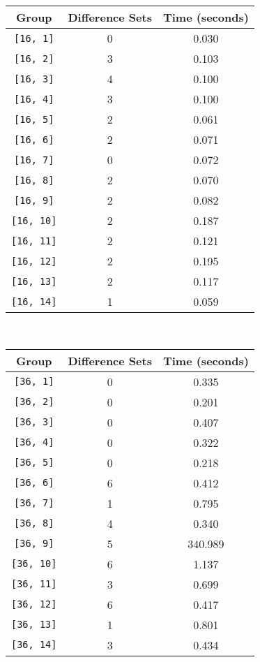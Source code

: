 \documentclass[a4paper,11pt]{report}
\begin{document}
{{ \begin{center}
\begin{tabular}{ccc}Group&
Difference Sets&
Time (seconds)\\
\hline
\texttt{[16, 1]}&
0&
0.030\\
\texttt{[16, 2]}&
3&
0.103\\
\texttt{[16, 3]}&
4&
0.100\\
\texttt{[16, 4]}&
3&
0.100\\
\texttt{[16, 5]}&
2&
0.061\\
\texttt{[16, 6]}&
2&
0.071\\
\texttt{[16, 7]}&
0&
0.072\\
\texttt{[16, 8]}&
2&
0.070\\
\texttt{[16, 9]}&
2&
0.082\\
\texttt{[16, 10]}&
2&
0.187\\
\texttt{[16, 11]}&
2&
0.121\\
\texttt{[16, 12]}&
2&
0.195\\
\texttt{[16, 13]}&
2&
0.117\\
\texttt{[16, 14]}&
1&
0.059\\
\end{tabular}\\[2mm]
\end{center}

 \begin{center}
\begin{tabular}{ccc}Group&
Difference Sets&
Time (seconds)\\
\hline
\texttt{[36, 1]}&
0&
0.335\\
\texttt{[36, 2]}&
0&
0.201\\
\texttt{[36, 3]}&
0&
0.407\\
\texttt{[36, 4]}&
0&
0.322\\
\texttt{[36, 5]}&
0&
0.218\\
\texttt{[36, 6]}&
6&
0.412\\
\texttt{[36, 7]}&
1&
0.795\\
\texttt{[36, 8]}&
4&
0.340\\
\texttt{[36, 9]}&
5&
340.989\\
\texttt{[36, 10]}&
6&
1.137\\
\texttt{[36, 11]}&
3&
0.699\\
\texttt{[36, 12]}&
6&
0.417\\
\texttt{[36, 13]}&
1&
0.801\\
\texttt{[36, 14]}&
3&
0.434\\
\end{tabular}\\[2mm]
\end{center}

}}
\end{document}

